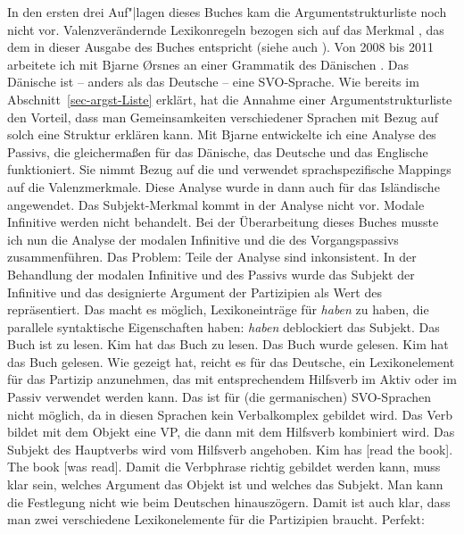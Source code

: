 {In den ersten drei Auf"|lagen dieses Buches kam die Argumentstrukturliste noch nicht
vor. Valenzverändernde Lexikonregeln bezogen sich auf das Merkmal \subcat, das dem \compsm in dieser
Ausgabe des Buches entspricht (siehe auch \citealt{Mueller2003e}). Von 2008 bis 2011 arbeitete ich mit Bjarne Ørsnes an einer Grammatik
des Dänischen \citep{MOeDanish}. Das Dänische ist -- anders als das Deutsche -- eine SVO-Sprache. Wie bereits im
Abschnitt~\ref{sec-argst-Liste} erklärt, hat die Annahme einer Argumentstrukturliste den Vorteil, dass man
Gemeinsamkeiten verschiedener Sprachen mit Bezug auf solch eine Struktur erklären kann. Mit Bjarne
entwickelte ich eine Analyse des Passivs, die gleichermaßen für das Dänische, das Deutsche und das
Englische funktioniert. Sie nimmt Bezug auf die \argstl und verwendet sprachspezifische Mappings auf
die Valenzmerkmale. Diese Analyse wurde in  dann auch für das Isländische
angewendet. Das Subjekt-Merkmal kommt in der Analyse nicht vor. Modale Infinitive werden
nicht behandelt. Bei der Überarbeitung dieses Buches musste ich nun die Analyse der modalen
Infinitive und die des Vorgangspassivs zusammenführen. Das Problem: Teile der Analyse sind
inkonsistent. In der Behandlung der modalen Infinitive und des Passivs wurde das Subjekt der
Infinitive und das designierte Argument der Partizipien als Wert des \subjms repräsentiert. Das
macht es möglich, Lexikoneinträge für \emph{haben} zu haben, die parallele syntaktische
Eigenschaften haben: \emph{haben} deblockiert das Subjekt.
\eal
\ex Das Buch ist zu lesen.
\ex Kim hat das Buch zu lesen.
\ex Das Buch wurde gelesen.
\ex Kim hat das Buch gelesen.
\zl
Wie \citet{Haider86} gezeigt hat, reicht es für das Deutsche, ein Lexikonelement für das Partizip
anzunehmen, das mit entsprechendem Hilfsverb im Aktiv oder im Passiv verwendet werden kann. Das ist
für (die germanischen) SVO-Sprachen nicht möglich, da in diesen Sprachen kein Verbalkomplex gebildet
wird. Das Verb bildet mit dem Objekt eine VP, die dann mit dem Hilfsverb kombiniert wird. Das
Subjekt des Hauptverbs wird vom Hilfsverb angehoben.
\eal
\ex Kim has [read the book].
\ex The book [was read].
\zl 
Damit die Verbphrase richtig gebildet werden kann, muss klar sein, welches Argument das Objekt ist
und welches das Subjekt. Man kann die Festlegung nicht wie beim Deutschen hinauszögern. Damit ist
auch klar, dass man zwei verschiedene Lexikonelemente für die Partizipien braucht.
\eal
\ex Perfekt:\\
    }
